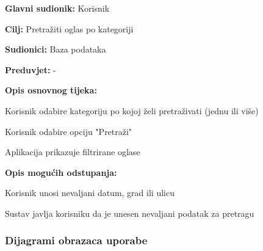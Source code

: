 \noindent {}
\begin{packed_item}
	
	\item \textbf{Glavni sudionik: } Korisnik
	\item  \textbf{Cilj:} Pretražiti oglas po kategoriji
	\item  \textbf{Sudionici:} Baza podataka
	\item  \textbf{Preduvjet:} -
	\item  \textbf{Opis osnovnog tijeka:}
	
	\item[] \begin{packed_enum}
		
		\item Korisnik odabire kategoriju po kojoj želi pretraživati (jednu ili više)
		\item Korisnik odabire opciju "Pretraži"
		\item Aplikacija prikazuje filtrirane oglase
		
	\end{packed_enum}
	
	\item  \textbf{Opis mogućih odstupanja:}
	
	\item[] \begin{packed_item}
		
		\item[1.a] Korisnik unosi nevaljani datum, grad ili ulicu
		\item[] \begin{packed_enum}
			
			\item Sustav javlja korisniku da je unesen nevaljani podatak za pretragu
			
			
		\end{packed_enum}
		
		
	\end{packed_item}
\end{packed_item}

\subsubsection{Dijagrami obrazaca uporabe}


